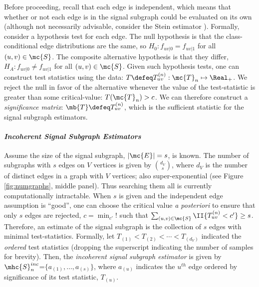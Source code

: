 \documentclass[10pt,journal,cspaper,compsoc]{IEEEtran}
\begin{document}
Before proceeding, recall that each edge is independent, which means that whether or not each edge is in the signal subgraph could be evaluated on its own (although not necessarily advisable, consider the Stein estimator \cite{Stein1956}).  Formally, consider a hypothesis test for each edge.  The null hypothesis is that the class-conditional edge distributions are the same, so $H_0: f_{uv|0}=f_{uv|1}$ for all $(u,v) \in \mc{S}$.  The composite alternative hypothesis is that they differ, $H_A: f_{uv|0} \neq f_{uv|1}$ for all $(u,v) \in \mc{S}$.  Given such hypothesis tests, one can construct test statistics using the data: $T \defeq T_{uv}^{(n)}: \mc{T}_n \mapsto \Real_+$.  We reject the null in favor of the alternative whenever the value of the test-statistic is greater than some critical-value: $T(\mc{T}_n)>c$.  We can therefore construct a \emph{significance matrix}: $\mb{T} \defeq T_{uv}^{(n)}$, which is the sufficient statistic for the signal subgraph estimators. %

\paragraph{\emph{Incoherent Signal Subgraph Estimators}} %
\label{par:paragraph_name}


Assume the size of the signal subgraph, $|\mc{E}|=s$, is known.  The number of subgraphs with $s$ edges on $V$ vertices is given by $\binom{d_V}{s}$, where $d_V$ is the number of distinct edges in a graph with $V$ vertices; also super-exponential (see Figure \ref{fig:numgraphs}, middle panel). Thus searching them all is currently computationally intractable.  When $s$ is given and the independent edge assumption is ``good'', one can choose the critical value \emph{a posteriori} to ensure that only $s$ edges are rejected, $c = \min_{c'}!$ such that $\sum_{(u,v) \in \mc{S}} \II \{T_{uv}^{(n)} < c'\} \geq s$.  Therefore, an estimate of the signal subgraph is the collection of $s$ edges with minimal test-statistics.  Formally, let $T_{(1)} < T_{(2)} < \cdots < T_{(d_V)}$ indicated the \emph{ordered} test statistics (dropping the superscript indicating the number of samples for brevity).  Then, the \emph{incoherent signal subgraph estimator} is given by $\mhc{S}^{inc}_n$=$\{a_{(1)}, \ldots, a_{(s)}\}$, where $a_{(u)}$ indicates the $u^{th}$ edge ordered by significance of its test statistic, $T_{(u)}$.  %
\end{document}
